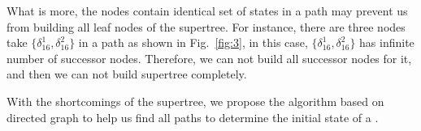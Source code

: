  What is more, the nodes contain identical set of states in a path may prevent us from building all leaf nodes of the supertree. For instance, there are three nodes take $\{\delta_{16}^1,\delta_{16}^2\}$ in a path as shown in Fig.~\ref{fig:3}, in this case, $\{\delta_{16}^1,\delta_{16}^2\}$ has infinite number of successor nodes. Therefore, we can not build all successor nodes for it, and then we can not build supertree completely.
 
With the shortcomings of the supertree, we propose the algorithm based on directed graph to help us find all paths to determine the initial state of a \BCN.
